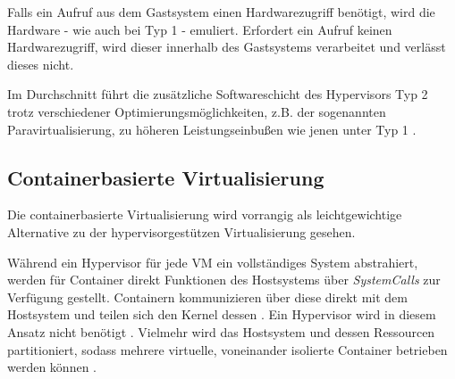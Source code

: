\documentclass[../main.tex]{subfiles}
\begin{document}
				Falls ein Aufruf aus dem Gastsystem einen Hardwarezugriff benötigt, wird die Hardware - wie auch bei Typ 1 - emuliert. Erfordert ein Aufruf keinen Hardwarezugriff, wird dieser innerhalb des Gastsystems verarbeitet und verlässt dieses nicht.

				Im Durchschnitt führt die zusätzliche Softwareschicht des Hypervisors Typ 2 trotz verschiedener Optimierungsmöglichkeiten, z.B. der sogenannten Paravirtualisierung, zu höheren Leistungseinbußen wie jenen unter Typ 1 \cite[S.666f.]{tanenbaumOS}.









    \subsection{Containerbasierte Virtualisierung}
    \label{introVirtContainer}
      Die containerbasierte Virtualisierung wird vorrangig als leichtgewichtige Alternative zu der hypervisorgestützen Virtualisierung gesehen\cite[S.2]{containerVirtPerformance}.

			Während ein Hypervisor für jede \acrshort{VM} ein vollständiges System abstrahiert, werden für Container direkt Funktionen des Hostsystems über \emph{\glspl{SystemCall}} zur Verfügung gestellt. Containern kommunizieren über diese direkt mit dem Hostsystem und teilen sich den Kernel dessen \cite[S.6f.]{dockerBook}\cite[S.2]{containerVirtPerformance}. Ein Hypervisor wird in diesem Ansatz nicht benötigt .	Vielmehr wird das Hostsystem und dessen Ressourcen partitioniert, sodass mehrere virtuelle, voneinander isolierte Container betrieben werden können \cite[S.3]{dockerSecIntro}\cite[S.1]{dockerSec2}.
\end{document}
